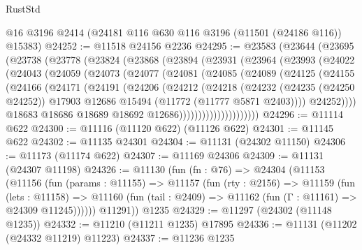 \begin{lexlean}{RustStd}
\begin{coremodule}
    @16
    @3196
    @2414
    (@24181 @116 @630 @116 @3196 (@11501 (@24186 @116)) @15383)
@24252 := @11518 @24156 @2236
@24295 := @23583
    (@23644
      (@23695
        (@23738
          (@23778
            (@23824
              (@23868
                (@23894
                  (@23931
                    (@23964
                      (@23993
                        (@24022
                          (@24043
                            (@24059
                              (@24073
                                (@24077
                                  (@24081
                                    (@24085
                                      (@24089
                                        (@24125
                                          (@24155
                                            (@24166
                                              (@24171
                                                (@24191
                                                  (@24206
                                                    (@24212
                                                      (@24218
                                                        (@24232
                                                          (@24235 (@24250 @24252))
                                                          @17903
                                                          @12686
                                                          @15494
                                                          (@11772 (@11777 @5871 @2403))))
                                                      @24252))))
                                              @18683
                                              @18686
                                              @18689
                                              @18692
                                              @12686)))))))))))))))))))))
@24296 := @11114 @622
@24300 := @11116 (@11120 @622) (@11126 @622)
@24301 := @11145 @622
@24302 := @11135 @24301
@24304 := @11131 (@24302 @11150)
@24306 := @11173 (@11174 @622)
@24307 := @11169 @24306
@24309 := @11131 (@24307 @11198)
@24326 := @11130
    (fun (fn : @76) =>
    @24304
      (@11153
        (@11156
          (fun (params : @11155) =>
          @11157
            (fun (rty : @2156) =>
            @11159
              (fun (lets : @11158) =>
              @11160 (fun (tail : @2409) => @11162 (fun (Γ : @11161) => @24309 @11245))))))
        @11291))
    @1235
@24329 := @11297 (@24302 (@11148 @1235))
@24332 := @11210 (@11211 @1235) @17895
@24336 := @11131 (@11202 (@24332 @11219) @11223)
@24337 := @11236 @1235

\end{coremodule}
\end{lexlean}
